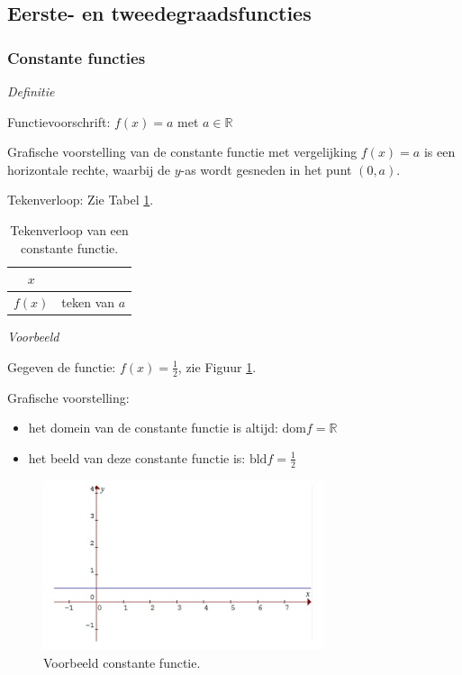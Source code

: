 \subsection{Eerste- en tweedegraadsfuncties}

\subsubsection{Constante functies}

\emph{Definitie}

Functievoorschrift: $f(x)=a$ met $a\in\mathbb{R}$


Grafische voorstelling van de constante functie
met vergelijking $f(x)=a$ is een horizontale rechte, waarbij de $y$-as
wordt gesneden in het punt $(0,a)$.


Tekenverloop: Zie Tabel \ref{tab:ct}.

\begin{table}[h]
	\centering\begin{tabular}{c||c}
		$x$ & \\
		\hline 
		$f(x)$ & teken van $a$\\
	\end{tabular}
	\caption{Tekenverloop van een constante functie.}
	\label{tab:ct}
\end{table}

\emph{Voorbeeld}

Gegeven de functie: $f(x)=\frac{1}{2}$, zie Figuur \ref{fig:ct}. 

Grafische voorstelling:
\begin{itemize}
\item het domein van de constante functie is altijd: $\textrm{dom}f=\mathbb{R}$
\item het beeld van deze constante functie is: $\textrm{bld}f=\frac{1}{2}$
\end{itemize}
\begin{figure}[h]
\centering{}\includegraphics[height=5cm]{2_elem_rekenvaardigheden_B/inputs/constantefuncties.jpg} 
\caption{Voorbeeld constante functie.}
\label{fig:ct}
\end{figure}

